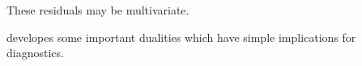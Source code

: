 \documentclass[Main.tex]{subfiles}
\begin{document}
These residuals may be multivariate.


\citet{HaslettHayes} developes some important dualities which have simple implications for diagnostics.









\end{document}
